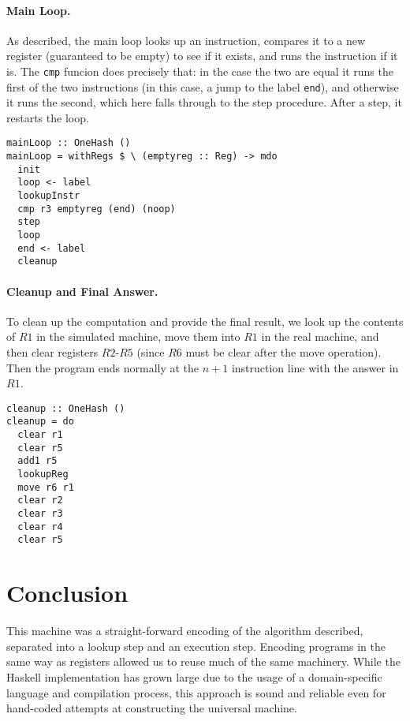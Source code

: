 \documentclass[10pt, preprint, nocopyrightspace]{sigplanconf}
\begin{document}
\paragraph{Main Loop.}

As described, the main loop looks up an instruction, compares it to a new
register (guaranteed to be empty) to see if it exists, and runs the instruction
if it is. The \lstinline{cmp} funcion does precisely that: in the case the two
are equal it runs the first of the two instructions (in this case, a jump to
the label \lstinline{end}), and otherwise it runs the second, which here falls
through to the step procedure. After a step, it restarts the loop.

\begin{lstlisting}
mainLoop :: OneHash ()
mainLoop = withRegs $ \ (emptyreg :: Reg) -> mdo
  init
  loop <- label
  lookupInstr
  cmp r3 emptyreg (end) (noop)
  step
  loop
  end <- label
  cleanup
\end{lstlisting}


\paragraph{Cleanup and Final Answer.}

To clean up the computation and provide the final result, we look up the
contents of $R1$ in the simulated machine, move them into $R1$ in the real
machine, and then clear registers $R2$-$R5$ (since $R6$ must be clear after the
move operation).
Then the program ends normally at the $n+1$ instruction line with the answer in
$R1$.

\begin{lstlisting}
cleanup :: OneHash ()
cleanup = do
  clear r1
  clear r5
  add1 r5
  lookupReg
  move r6 r1
  clear r2
  clear r3
  clear r4
  clear r5
\end{lstlisting}

\section{Conclusion}

This machine was a straight-forward encoding of the algorithm described,
separated into a lookup step and an execution step. Encoding programs in the
same way as registers allowed us to reuse much of the same machinery. While the
Haskell implementation has grown large due to the usage of a domain-specific
language and compilation process, this approach is sound and reliable even for
hand-coded attempts at constructing the universal machine.
\end{document}
